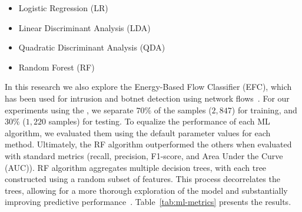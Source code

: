 
\begin{itemize}
 \item Logistic Regression (LR)
 \item Linear Discriminant Analysis (LDA)
 \item Quadratic Discriminant Analysis (QDA)
 \item Random Forest (RF)
\end{itemize}


In this research we also explore the Energy-Based Flow Classifier (EFC), which has been used for intrusion and botnet detection using
network flows~\cite{DBLP:journals/tnsm/PontesSGBM21}. For our experiments using the \fds, we separate $70\%$ of the samples ($2,847$) for
training, and $30\%$ ($1,220$ samples) for testing. To equalize the performance of each ML algorithm, we evaluated them using the default parameter values for each method.
Ultimately, the RF algorithm outperformed the others when evaluated with standard metrics (recall, precision, F1-score, and Area Under the Curve (AUC)). RF algorithm aggregates multiple decision trees,
with each tree constructed using a random subset of features. This process decorrelates the trees, allowing for a more thorough
exploration of the model and substantially improving predictive performance~\cite{james2023introduction}.
Table~\ref{tab:ml-metrics} presents the results. 

\begin{table}[htb]
    \caption{Accuracy of the ML algorithms to classify the app as malware or non-malware using network flow data from the \fds.}
 \label{tab:ml-metrics}
\end{table}

